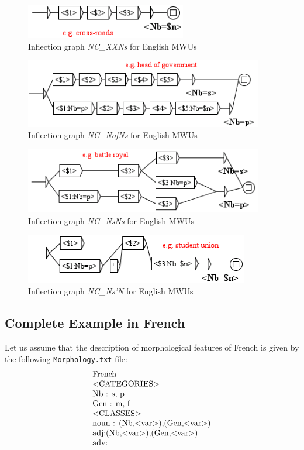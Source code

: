 \begin{figure}[!htb]
  \centering
  \includegraphics[width=7cm]{resources/img/NC'XXNs'EN.png}
  \caption{Inflection graph \emph{NC\_XXNs} for English MWUs}
  \label{fig:NC'XXNs'EN}
\end{figure}

\begin{figure}[!htb]
  \centering
  \includegraphics[width=10.4cm]{resources/img/NC'NofNs'EN.png}
  \caption{Inflection graph \emph{NC\_NofNs} for English MWUs}
  \label{fig:NC'NofNs'EN}
\end{figure}

\begin{figure}[!htb]
  \centering
  \includegraphics[width=10.4cm]{resources/img/NC'NsNs'EN.png}
  \caption{Inflection graph \emph{NC\_NsNs} for English MWUs}
  \label{fig:NC'NsNs'EN}
\end{figure}

\begin{figure}[!htb]
  \centering
  \includegraphics[width=9.8cm]{resources/img/NC'Ns'N'EN.png}
  \caption{Inflection graph \emph{NC\_Ns'N} for English MWUs}
  \label{fig:NC'Ns'N'EN}
\end{figure}

\subsection{Complete Example in French}
Let us assume that the description of morphological features of French is given
by the following \verb+Morphology.txt+ file:
\[
\begin{array}[l]{l}
$French$ \\
$<CATEGORIES>$ \\
$Nb : s, p$ \\
$Gen : m, f$ \\
$<CLASSES>$ \\
$noun : (Nb,<var>),(Gen,<var>)$ \\
$adj:(Nb,<var>),(Gen,<var>)$ \\
$adv:$
\end{array}
\]

